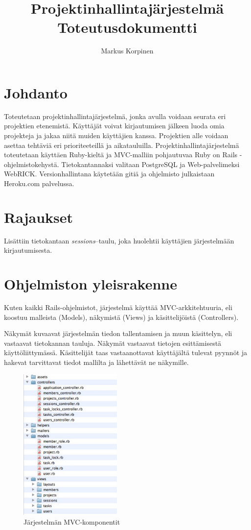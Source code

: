 \documentclass[12pt,a4paper]{article}
\title{Projektinhallintajärjestelmä\\Toteutusdokumentti}
\author{Markus Korpinen}
\begin{document}
\maketitle
\section*{Johdanto}
Toteutetaan projektinhallintajärjestelmä, jonka avulla voidaan seurata eri projektien etenemistä. Käyttäjät voivat kirjautumisen jälkeen luoda omia projekteja ja jakaa niitä muiden käyttäjien kanssa. Projektien alle voidaan asettaa  tehtäviä eri prioriteeteillä ja aikatauluilla. Projektinhallintajärjestelmä toteutetaan käyttäen Ruby-kieltä ja MVC-malliin pohjautuvaa Ruby on Rails -ohjelmistokehystä. Tietokantannaksi valitaan PostgreSQL ja Web-palvelimeksi WebRICK. Versionhallintana käytetään gitiä ja ohjelmisto julkaistaan Heroku.com palvelussa.
\section*{Rajaukset}
Lisättiin tietokantaan \textit{sessions}--taulu, joka huolehtii käyttäjien järjestelmään kirjautumisesta.

\section*{Ohjelmiston yleisrakenne}
Kuten kaikki Rails-ohjelmistot, järjestelmä käyttää MVC-arkkitehtuuria, eli koostuu
malleista (Models), näkymistä (Views) ja käsittelijöistä (Controllers).

Näkymät kuvaavat järjestelmän tiedon tallentamisen ja muun käsittelyn, eli vastaavat
tietokannan tauluja. Näkymät vastaavat tietojen esittämisestä käyttöliittymässä. Käsittelijät
taas vastaanottavat käyttäjältä tulevat pyynnöt ja hakevat tarvittavat tiedot mallilta ja
lähettävät ne näkymille.

\begin{figure}[h!]
	\centering
	\caption{Järjestelmän MVC-komponentit}
	\includegraphics[width=0.45\textwidth]{mvc.pdf}
\end{figure}
\end{document}
